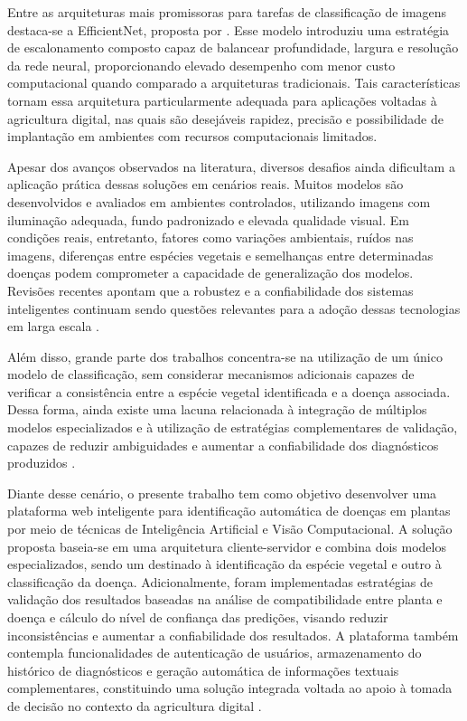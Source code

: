 \documentclass[portuguese]{sbc2025}%
\begin{document}
Entre as arquiteturas mais promissoras para tarefas de classificação de imagens destaca-se a EfficientNet, proposta por \citep{ref4}. 
Esse modelo introduziu uma estratégia de escalonamento composto capaz de balancear profundidade, largura e resolução da rede 
neural, proporcionando elevado desempenho com menor custo computacional quando comparado a arquiteturas tradicionais. 
Tais características tornam essa arquitetura particularmente adequada para aplicações voltadas à agricultura digital, nas 
quais são desejáveis rapidez, precisão e possibilidade de implantação em ambientes com recursos computacionais limitados.

Apesar dos avanços observados na literatura, diversos desafios ainda dificultam a aplicação prática dessas soluções em 
cenários reais. Muitos modelos são desenvolvidos e avaliados em ambientes controlados, utilizando imagens com iluminação 
adequada, fundo padronizado e elevada qualidade visual. Em condições reais, entretanto, fatores como variações ambientais, 
ruídos nas imagens, diferenças entre espécies vegetais e semelhanças entre determinadas doenças podem comprometer a capacidade 
de generalização dos modelos. Revisões recentes apontam que a robustez e a confiabilidade dos sistemas inteligentes continuam 
sendo questões relevantes para a adoção dessas tecnologias em larga escala \citep{ref2}.

Além disso, grande parte dos trabalhos concentra-se na utilização de um único modelo de classificação, sem considerar mecanismos 
adicionais capazes de verificar a consistência entre a espécie vegetal identificada e a doença associada. Dessa forma, ainda 
existe uma lacuna relacionada à integração de múltiplos modelos especializados e à utilização de estratégias complementares de 
validação, capazes de reduzir ambiguidades e aumentar a confiabilidade dos diagnósticos produzidos \citep{ref5}.

Diante desse cenário, o presente trabalho tem como objetivo desenvolver uma plataforma web inteligente para identificação automática
de doenças em plantas por meio de técnicas de Inteligência Artificial e Visão Computacional. A solução proposta baseia-se em uma 
arquitetura cliente-servidor e combina dois modelos especializados, sendo um destinado à identificação da espécie vegetal e outro 
à classificação da doença. Adicionalmente, foram implementadas estratégias de validação dos resultados baseadas na análise de compatibilidade entre 
planta e doença e cálculo do nível de confiança das predições, visando reduzir inconsistências e aumentar a confiabilidade dos 
resultados. A plataforma também contempla funcionalidades de autenticação de usuários, armazenamento do histórico de diagnósticos 
e geração automática de informações textuais complementares, constituindo uma solução integrada voltada ao apoio à tomada de decisão
no contexto da agricultura digital \citep{ref6}.
\end{document}
